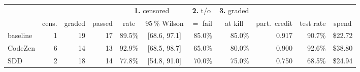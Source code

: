 
\begin{tabular}{@{}lrrrrcrrrrr@{}}
\toprule
 & & & & \multicolumn{2}{c}{\textbf{1.} censored} & \multicolumn{1}{c}{\textbf{2.} t/o} &
 \multicolumn{1}{c}{\textbf{3.} graded} & & & \\
\cmidrule(lr){5-6}\cmidrule(lr){7-7}\cmidrule(lr){8-8}
 & \multicolumn{1}{c}{cens.} & \multicolumn{1}{c}{graded} &
 \multicolumn{1}{c}{passed} & \multicolumn{1}{c}{rate} & \multicolumn{1}{c}{95\,\% Wilson} &
 \multicolumn{1}{c}{$=$ fail} & \multicolumn{1}{c}{at kill} &
 \multicolumn{1}{c}{part.\ credit} &
 \multicolumn{1}{c}{test rate} & \multicolumn{1}{c}{spend} \\
\midrule
baseline & 1 & 19 & 17 & 89.5\% & [68.6, 97.1] & 85.0\% & 85.0\% & 0.917 & 90.7\% & \$22.72 \\
CodeZen & 6 & 14 & 13 & 92.9\% & [68.5, 98.7] & 65.0\% & 80.0\% & 0.900 & 92.6\% & \$38.80 \\
SDD & 2 & 18 & 14 & 77.8\% & [54.8, 91.0] & 70.0\% & 75.0\% & 0.750 & 68.5\% & \$24.94 \\
\bottomrule
\end{tabular}
